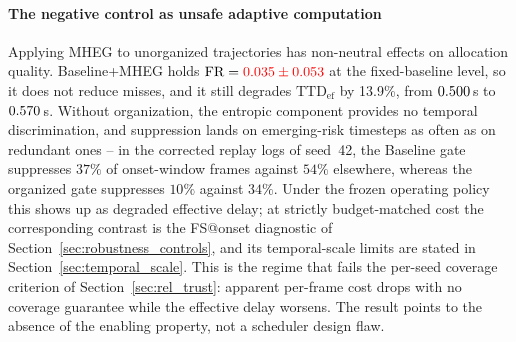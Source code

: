 \documentclass[a4paper,fleqn]{cas-dc}
\newcommand{\MHEG}{\mbox{MHEG}\xspace}
\begin{document}
\begin{table}[!tbp]
\centering
\caption{Global factorial study results under continuous causal streaming
(mean $\pm$ inter-seed standard deviation{\color{\revcolor}; twelve seeds,
42--53}). {\color{\revcolor}Twelve-seed campaign executed with the same frozen
pipeline as the initial four-seed campaign; ms/f is measured wall-clock time
and is homogeneous within this campaign.}}
\label{tab:resultados_principais}
\scriptsize
\setlength{\tabcolsep}{3pt}
\renewcommand{\arraystretch}{1.22}
%
\end{table}
\paragraph{The negative control as unsafe adaptive computation}
Applying \MHEG to unorganized trajectories has non-neutral effects on allocation
quality. Baseline+MHEG holds $\text{FR} = {\color{red}0.035 \pm 0.053}$
at the fixed-baseline level, so it does not reduce misses, and it still degrades
$\mathrm{TTD}_{\mathrm{ef}}$ by {\color{\revcolor}13.9\%, from $0.500$\,s to
$0.570$\,s}. {\color{\revcolor}Without organization, the entropic component provides no
temporal discrimination, and suppression lands on emerging-risk timesteps as
often as on redundant ones -- in the corrected replay logs of seed~42, the
Baseline gate suppresses $37\%$ of onset-window frames against $54\%$
elsewhere, whereas the organized gate suppresses $10\%$ against $34\%$. Under
the frozen operating policy this shows up as degraded effective delay; at
strictly budget-matched cost the corresponding contrast is the FS@onset
diagnostic of Section~\ref{sec:robustness_controls}, and its temporal-scale
limits are stated in Section~\ref{sec:temporal_scale}.} This is the
regime that fails the per-seed coverage criterion of
Section~\ref{sec:rel_trust}: apparent per-frame cost drops with no coverage
guarantee while the effective delay worsens. The result points to the absence of the enabling
property, not a scheduler design flaw.
\end{document}
